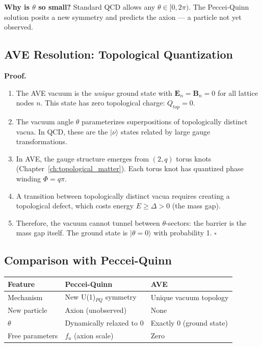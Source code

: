 \textbf{Why is $\theta$ so small?}  Standard QCD allows any
$\theta \in [0, 2\pi)$.  The Peccei-Quinn solution posits a
new symmetry and predicts the axion --- a particle not yet observed.

\subsection{AVE Resolution: Topological Quantization}

\noindent{}

\medskip\noindent
\textbf{Proof.}
\begin{enumerate}
    \item The AVE vacuum is the \textit{unique} ground state with
    $\mathbf{E}_n = \mathbf{B}_n = 0$ for all lattice nodes $n$.
    This state has zero topological charge: $Q_{top} = 0$.

    \item The vacuum angle $\theta$ parameterizes superpositions of
    topologically distinct vacua.  In QCD, these are the
    $|\nu\rangle$ states related by large gauge transformations.

    \item In AVE, the gauge structure emerges from $(2,q)$ torus knots
    (Chapter~\ref{ch:topological_matter}).  Each torus knot has
    quantized phase winding $\Phi = q\pi$.

    \item A transition between topologically distinct vacua requires
    creating a topological defect, which costs energy
    $E \ge \Delta > 0$ (the mass gap).

    \item Therefore, the vacuum cannot tunnel between $\theta$-sectors:
    the barrier is the mass gap itself.  The ground state is
    $|\theta = 0\rangle$ with probability 1.
    \hfill$\square$
\end{enumerate}

\subsection{Comparison with Peccei-Quinn}

\begin{center}
\small
\begin{tabular}{lll}
\toprule
\textbf{Feature} & \textbf{Peccei-Quinn} & \textbf{AVE} \\
\midrule
Mechanism      & New U(1)$_{PQ}$ symmetry & Unique vacuum topology \\
New particle   & Axion (unobserved)       & None \\
$\theta$       & Dynamically relaxed to 0 & Exactly 0 (ground state) \\
Free parameters& $f_a$ (axion scale)      & Zero \\
\bottomrule
\end{tabular}
\end{center}

